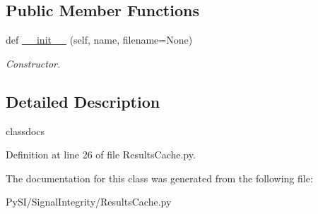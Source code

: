 \subsection*{Public Member Functions}
\begin{DoxyCompactItemize}
\item 
\mbox{\label{classSignalIntegrity_1_1ResultsCache_1_1ResultsCache_a19e3e370f701435403ddb078f27f1ecb}} 
def \hyperlink{classSignalIntegrity_1_1ResultsCache_1_1ResultsCache_a19e3e370f701435403ddb078f27f1ecb}{\+\_\+\+\_\+init\+\_\+\+\_\+} (self, name, filename=None)
\begin{DoxyCompactList}\small\item\em Constructor. \end{DoxyCompactList}\end{DoxyCompactItemize}


\subsection{Detailed Description}
classdocs 

Definition at line 26 of file Results\+Cache.\+py.



The documentation for this class was generated from the following file\+:\begin{DoxyCompactItemize}
\item 
Py\+S\+I/\+Signal\+Integrity/Results\+Cache.\+py\end{DoxyCompactItemize}

